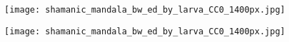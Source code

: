 
  \tableofcontents


  \checkoddpage%
  \ifoddpage%
    \begin{center}%
      \vspace*{\fill}%
      \texttt{[image: shamanic\_mandala\_bw\_ed\_by\_larva\_CC0\_1400px.jpg]}
      \vspace*{\fill}%
    \end{center}
  \else%
    \clearpage%
    \begin{center}%
      \vspace*{\fill}%
      \texttt{[image: shamanic\_mandala\_bw\_ed\_by\_larva\_CC0\_1400px.jpg]}
      \vspace*{\fill}%
    \end{center}
  \fi%

